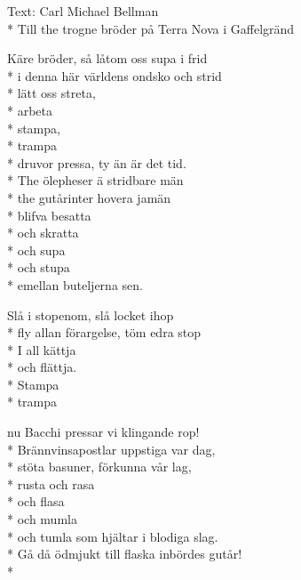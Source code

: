 \begin{SongText}
    \begin{SongInfo}
        Text: Carl Michael Bellman\\*%
        Till the trogne bröder på Terra Nova i Gaffelgränd
    \end{SongInfo}
    \begin{SongVerse}
        Käre bröder, så låtom oss supa i frid\\*%
        i denna här världens ondsko och strid\\*%
        lätt oss streta,\\*%
        arbeta\\*%
        stampa,\\*%
        trampa\\*%
        druvor pressa, ty än är det tid.\\*%
        The ölepheser ä stridbare män\\*%
        the gutårinter hovera jamän\\*%
        blifva besatta\\*%
        och skratta\\*%
        och supa\\*%
        och stupa\\*%
        emellan buteljerna sen.
    \end{SongVerse}
    \begin{SongVerse}
        Slå i stopenom, slå locket ihop\\*%
        fly allan förargelse, töm edra stop\\*%
        I all kättja\\*%
        och flättja.\\*%
        Stampa\\*%
        trampa
    \end{SongVerse}
    \begin{SongVerse}
        nu Bacchi pressar vi klingande rop!\\*%
        Brännvinsapostlar uppstiga var dag,\\*%
        stöta basuner, förkunna vår lag,\\*%
        rusta och rasa\\*%
        och flasa\\*%
        och mumla\\*%
        och tumla som hjältar i blodiga slag.\\*%
        Gå då ödmjukt till flaska inbördes gutår!\\*%

\end{SongVerse}
\end{SongText}
